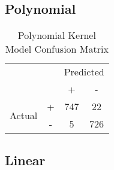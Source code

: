 \subsection{Polynomial}





\begin{table}[h!]
    \centering
    \begin{tabular}[h]{c c|c|c|}
        \cline{3-4}
        & & \multicolumn{2}{c|}{Predicted} \\
        \cline{3-4}
        & & + & - \\
        \hline
        \multicolumn{1}{|c|}{\multirow{2}{3em}{Actual}} & + & 747 & 22 \\
        \cline{2-4}
        \multicolumn{1}{|c|}{} & - & 5 & 726 \\
        \hline
    \end{tabular}
    \caption{\label{tab:poly_confusion}Polynomial Kernel Model Confusion Matrix}
\end{table}

\subsection{Linear}




